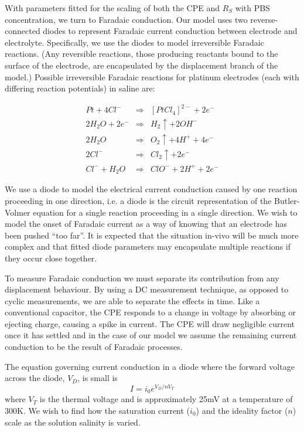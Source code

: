 \documentclass[journal, a4paper]{IEEEtran}
\begin{document}
With parameters fitted for the scaling of both the CPE and $R_{S}$ with PBS concentration, we turn to Faradaic conduction.
Our model uses two reverse-connected diodes to represent Faradaic current conduction between electrode and electrolyte. Specifically, we use the diodes to model irreversible Faradaic reactions. (Any reversible reactions, those producing reactants bound to the surface of the electrode, are encapsulated by the displacement branch of the model.)
Possible irreversible Faradaic reactions for platinum electrodes (each with differing reaction potentials) in saline are:

\begin{align}
    Pt + 4Cl^{-} &\Rightarrow& [PtCl_{4}]^{2-} + 2 e^{-} \label{eqn:ptCl}\\
    2H_{2}O + 2 e^{-} &\Rightarrow& H_{2}\uparrow + 2OH^{-} \label{eqn:H20}\\
    2H_{2}O &\Rightarrow& O_{2}\uparrow + 4H^{+} + 4e^{-} \label{eqn:2H20}\\
    2Cl^{-} &\Rightarrow& Cl_{2}\uparrow + 2e^{-} \label{eqn:Cl} \\
    Cl^{-} + H_{2}O &\Rightarrow& ClO^{-} + 2H^{+} + 2e^{-} \label{eqn:ClH20}
\end{align}

We use a diode to model the electrical current conduction caused by one reaction proceeding in one direction, i.e. a diode is the circuit representation of the Butler-Volmer equation for a single reaction proceeding in a single direction. 
    We wish to model the onset of Faradaic current as a way of knowing that an electrode has been pushed ``too far''. It is expected that the situation in-vivo will be much more complex and that fitted diode parameters may encapsulate multiple reactions if they occur close together.

To measure Faradaic conduction we must separate its contribution from any displacement behaviour. By using a DC measurement technique, as opposed to cyclic measurements, we are able to separate the effects in time.
Like a conventional capacitor, the CPE responds to a change in voltage by absorbing or ejecting charge, causing a spike in current. The CPE will draw negligible current once it has settled and in the case of our model we assume the remaining current conduction to be the result of Faradaic processes.

The equation governing current conduction in a diode where the forward voltage across the diode, $V_{D}$, is small is
\begin{equation}
    I = i_{0}  e^{V_{D} / n V_{T}}
\end{equation}
where $V_{T}$ is the thermal voltage and is approximately 25\thinspace mV at a temperature of 300\thinspace K. We wish to find how the saturation current ($i_{0}$) and the ideality factor ($n$) scale as the solution salinity is varied.
\end{document}
